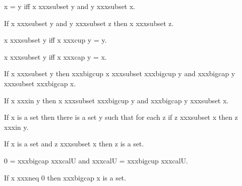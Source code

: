 \documentclass[a4paper,draft]{amsproc}
\begin{document}
{\begin{forthel}
\begin{theorem}[27]
x = y iff x xxxsubset y and y xxxsubset x.
\end{theorem}

\begin{theorem}[28]
If x xxxsubset y and y xxxsubset z then x xxxsubset z.
\end{theorem}

\begin{theorem}[29]
x xxxsubset y iff x xxxcup y = y.
\end{theorem}

\begin{theorem}[30]
x xxxsubset y iff x xxxcap y = x.
\end{theorem}

\begin{theorem}[31]
If x xxxsubset y then xxxbigcup x xxxsubset xxxbigcup y
and xxxbigcap y xxxsubset xxxbigcap x.
\end{theorem}

\begin{theorem}[32]
If x xxxin y then x xxxsubset xxxbigcup y 
and xxxbigcap y xxxsubset x.
\end{theorem}


\begin{axiom}
If x is a set then there is a set y such that for each
z if z xxxsubset x then z xxxin y.
\end{axiom}


\begin{theorem}[33]
If x is a set and z xxxsubset x then z is a set.
\end{theorem}

\begin{theorem}[34]
0 = xxxbigcap xxxcal{U} and xxxcal{U} = xxxbigcup xxxcal{U}.
\end{theorem}

\begin{theorem}[35]
If x xxxneq 0 then xxxbigcap x is a set.
\end{theorem}


\end{forthel}}
\end{document}
